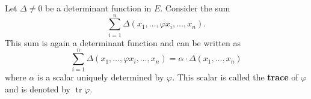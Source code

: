 Let $\Delta \neq 0$ be a determinant function in $E$. Consider the sum
$$\sum_{i=1}^{n} \Delta(x_1, \ldots, \varphi x_i, \ldots, x_n).$$
This sum is again a determinant function and can be written as
$$\sum_{i=1}^{n} \Delta(x_1, \ldots, \varphi x_i, \ldots, x_n) = \alpha \cdot \Delta(x_1, \ldots, x_n)$$
where $\alpha$ is a scalar uniquely determined by $\varphi$. This scalar is called the \textbf{trace} of $\varphi$ and is denoted by $\operatorname{tr} \varphi$.

